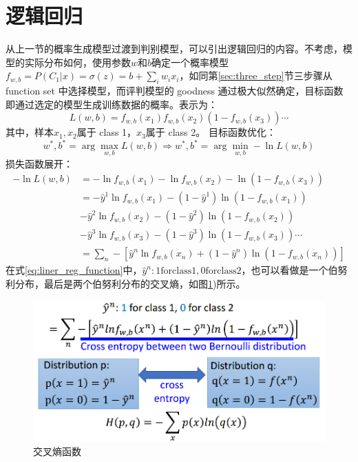 \section{逻辑回归}
从上一节的概率生成模型过渡到判别模型，可以引出逻辑回归的内容。不考虑，模型的实际分布如何，使用参数$w$和$b$确定一个概率模型$f_{w,b}=P(C_1|x)=\sigma(z)=b+\sum_i w_i x_i$，如同第\ref{sec:three_step}节三步骤从 function set 中选择模型，而评判模型的 goodness 通过极大似然确定，目标函数即通过选定的模型生成训练数据的概率。表示为：
\begin{equation}
L(w,b)=f_{w,b}(x_1)f_{w,b}(x_2)(1-f_{w,b}(x_3)) \cdots
\end{equation}
其中，样本$x_1,x_2$属于 class 1，$x_3$属于 class 2。
目标函数优化：
\begin{equation}
w^*,b^* = \arg \max_{w,b} L(w,b) \Rightarrow w^*,b^* = \arg \min_{w,b} -\ln L(w,b)
\end{equation}
损失函数展开：
\begin{align}\label{eq:liner_reg_function}
-\ln L(w,b) &= -\ln f_{w,b}(x_1) -\ln f_{w,b}(x_2) - \ln (1-f_{w,b}(x_3))\\
			&= -\hat{y}^1 \ln f_{w,b}(x_1) - (1-\hat{y}^1) \ln (1-f_{w,b}(x_1))\\
			&-\hat{y}^2 \ln f_{w,b}(x_2) - (1-\hat{y}^2) \ln (1-f_{w,b}(x_2))\\
			&-\hat{y}^3 \ln f_{w,b}(x_3) - (1-\hat{y}^3) \ln (1-f_{w,b}(x_3))\cdots\\ 
			&=\sum_n -\left[ \hat{y}^n \ln f_{w,b}(x_n) + (1-\hat{y}^n) \ln (1-f_{w,b}(x_n))
			\right]
\end{align}
在式\eqref{eq:liner_reg_function}中，$\hat{y}^n: \mathrm{1 for class1, 0 for class2}$，也可以看做是一个伯努利分布，最后是两个伯努利分布的交叉熵，如图\ref{fig:cross_entropy})所示。
\begin{figure}[htb]
	\centering
	\includegraphics[scale=0.4]{pic/cross_entropy_bernoulli}
	\caption{交叉熵函数}
	\label{fig:cross_entropy}
\end{figure}
